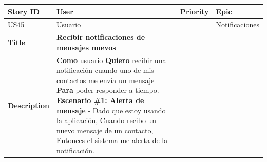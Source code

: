 {\def\LTcaptype{none} %
\begin{longtable}[]{@{}
  >{\raggedright\arraybackslash}p{}
  >{\raggedright\arraybackslash}p{}
  >{\raggedright\arraybackslash}p{}
  >{\raggedright\arraybackslash}p{}@{}}
\toprule\noalign{}
\begin{minipage}[b]{\linewidth}\raggedright
Story ID
\end{minipage} & \begin{minipage}[b]{\linewidth}\raggedright
User
\end{minipage} & \begin{minipage}[b]{\linewidth}\raggedright
Priority
\end{minipage} & \begin{minipage}[b]{\linewidth}\raggedright
Epic
\end{minipage} \\
\midrule\noalign{}
\endhead
\bottomrule\noalign{}
\endlastfoot
US45 & Usuario & 5 & Notificaciones \\
\textbf{Title} & \textbf{Recibir notificaciones de mensajes nuevos} &
& \\
\textbf{Description} & \textbf{Como} usuario \textbf{Quiero} recibir una
notificación cuando uno de mis contactos me envía un mensaje
\textbf{Para} poder responder a tiempo. \textbf{Escenario \#1: Alerta de
mensaje} - Dado que estoy usando la aplicación, Cuando recibo un nuevo
mensaje de un contacto, Entonces el sistema me alerta de la
notificación. & & \\
\end{longtable}
}


